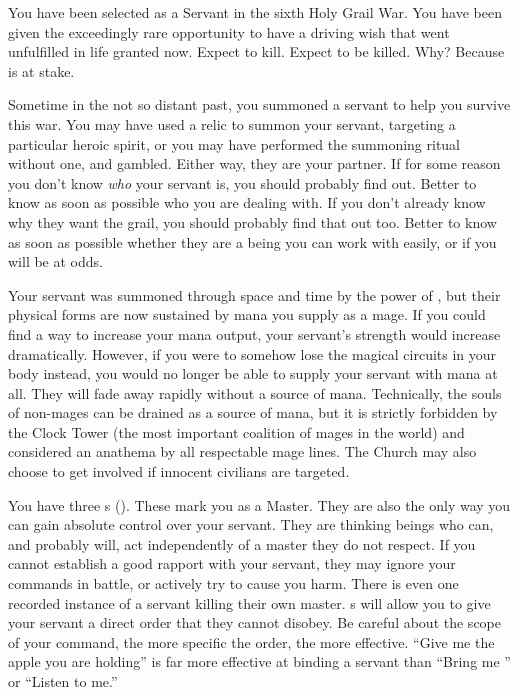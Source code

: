 \documentclass[blue]{FateDarkDawn}
\begin{document}
\name{\bServant{}}

You have been selected as a Servant in the sixth Holy Grail War. You have been given the exceedingly rare opportunity to have a driving wish that went unfulfilled in life granted now. Expect to kill. Expect to be killed. Why? Because \iGrail{} is at stake.

Sometime in the not so distant past, you summoned a servant to help you survive this war. You may have used a relic to summon your servant, targeting a particular heroic spirit, or you may have performed the summoning ritual without one, and gambled. Either way, they are your partner. If for some reason you don't know \emph{who} your servant is, you should probably find out. Better to know as soon as possible who you are dealing with. If you don't already know why they want the grail, you should probably find that out too. Better to know as soon as possible whether they are a being you can work with easily, or if you will be at odds.

Your servant was summoned through space and time by the power of \iGrail{\MYname}, but their physical forms are now sustained by mana you supply as a mage. If you could find a way to increase your mana output, your servant's strength would increase dramatically. However, if you were to somehow lose the magical circuits in your body instead, you would no longer be able to supply your servant with mana at all. They will fade away rapidly without a source of mana. Technically, the souls of non-mages can be drained as a source of mana, but it is strictly forbidden by the Clock Tower (the most important coalition of mages in the world) and considered an anathema by all respectable mage lines. The Church may also choose to get involved if innocent civilians are  targeted.

You have three \iCommand{\MYname}s (\iCommand{\MYnumber}). These mark you as a Master. They are also the only way you can gain absolute control over your servant. They are thinking beings who can, and probably will, act independently of a master they do not respect. If you cannot establish a good rapport with your servant, they may ignore your commands in battle, or actively try to cause you harm. There is even one recorded instance of a servant killing their own master. \iCommand{\MYname}s will allow you to give your servant a direct order that they cannot disobey. Be careful about the scope of your command, the more specific the order, the more effective. ``Give me the apple you are holding'' is far more effective at binding a servant than ``Bring me \iGrail{\MYname}'' or ``Listen to me.''
\end{document}
